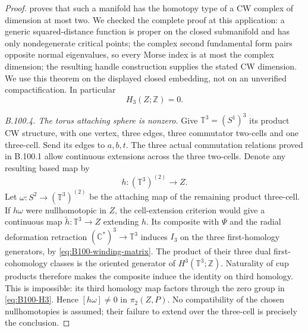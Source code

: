 \begin{proof}
\citet[Theorems7.1--7.2, pp.~39--41]{BMilnor1963} proves that
such a manifold has the homotopy type of a CW complex of dimension
at most two.  We checked the complete proof at this application:
a generic squared-distance function is proper on the closed
submanifold and has only nondegenerate critical points; the
complex second fundamental form pairs opposite normal
eigenvalues, so every Morse index is at most the complex
dimension; the resulting handle construction supplies the stated
CW dimension.  We use this theorem on the displayed closed
embedding, not on an unverified compactification.  In particular
\begin{equation}\label{eq:B100-H3}
                         H_3(Z;\mathbb Z)=0.
\end{equation}

\emph{B.100.4. The torus attaching sphere is nonzero.}
Give $\mathbb T^3=(S^1)^3$ its product CW structure, with one
vertex, three edges, three commutator two-cells and one three-cell.
Send its edges to $a,b,t$.  The three actual commutation relations
proved in B.100.1 allow continuous extensions across the three
two-cells.  Denote any resulting based map by
\[
 h:(\mathbb T^3)^{(2)}\longrightarrow Z.
\]
Let $\omega:S^2\to(\mathbb T^3)^{(2)}$ be the attaching map of
the remaining product three-cell.  If $h\omega$ were
nullhomotopic in $Z$, the cell-extension criterion would give a
continuous map $\widetilde h:\mathbb T^3\to Z$ extending $h$.
Its composite with $\Psi$ and the radial deformation retraction
$(\mathbb C^*)^3\to\mathbb T^3$ induces $I_3$ on the three
first-homology generators, by \eqref{eq:B100-winding-matrix}.
The product of their three dual first-cohomology classes is the
oriented generator of $H^3(\mathbb T^3;\mathbb Z)$.
Naturality of cup products therefore makes the composite induce
the identity on third homology.  This is impossible: its third
homology map factors through the zero group in
\eqref{eq:B100-H3}.  Hence $[h\omega]\ne0$ in $\pi_2(Z,P)$.
No compatibility of the chosen nullhomotopies is assumed; their
failure to extend over the three-cell is precisely the conclusion.


\end{proof}
